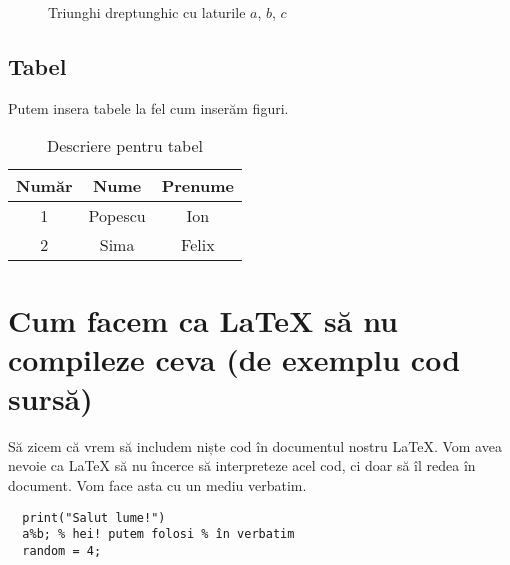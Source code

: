 \documentclass[12pt]{article}
\begin{document}
\begin{figure}[H] %
    \centering %
    \caption{Triunghi dreptunghic cu laturile $a$, $b$, $c$}
    \label{fig:right-triangle}
\end{figure}

\subsection{Tabel}
Putem insera tabele la fel cum inserăm figuri.

\begin{table}[H]
  \caption{Descriere pentru tabel}
  \begin{tabular}{c|cc}
    Număr &  Nume & Prenume \\ %
    \hline %
    1 & Popescu & Ion \\
    2 & Sima & Felix
  \end{tabular}
\end{table}


\section{Cum facem ca LaTeX să nu compileze ceva (de exemplu cod sursă)}
Să zicem că vrem să includem niște cod în documentul nostru LaTeX.
Vom avea nevoie ca LaTeX să nu încerce să interpreteze acel cod,
ci doar să îl redea în document. Vom face asta cu un mediu verbatim.

\begin{verbatim}
  print("Salut lume!")
  a%b; % hei! putem folosi % în verbatim
  random = 4;
\end{verbatim}
\end{document}

